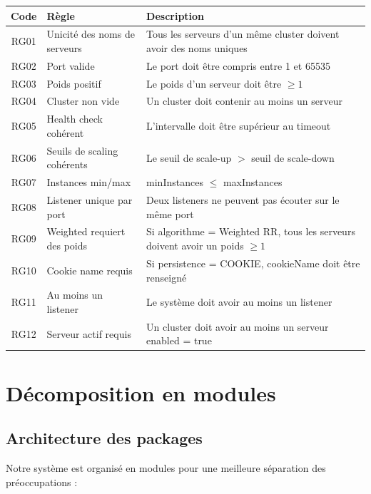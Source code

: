 \documentclass[12pt,a4paper]{report}
\begin{document}
\begin{longtable}{|c|p{4cm}|p{8.5cm}|}
\hline
\textbf{Code} & \textbf{Règle} & \textbf{Description} \\
\hline
\endhead
RG01 & Unicité des noms de serveurs & Tous les serveurs d'un même cluster doivent avoir des noms uniques \\
\hline
RG02 & Port valide & Le port doit être compris entre 1 et 65535 \\
\hline
RG03 & Poids positif & Le poids d'un serveur doit être $\geq 1$ \\
\hline
RG04 & Cluster non vide & Un cluster doit contenir au moins un serveur \\
\hline
RG05 & Health check cohérent & L'intervalle doit être supérieur au timeout \\
\hline
RG06 & Seuils de scaling cohérents & Le seuil de scale-up $>$ seuil de scale-down \\
\hline
RG07 & Instances min/max & minInstances $\leq$ maxInstances \\
\hline
RG08 & Listener unique par port & Deux listeners ne peuvent pas écouter sur le même port \\
\hline
RG09 & Weighted requiert des poids & Si algorithme = Weighted RR, tous les serveurs doivent avoir un poids $\geq 1$ \\
\hline
RG10 & Cookie name requis & Si persistence = COOKIE, cookieName doit être renseigné \\
\hline
RG11 & Au moins un listener & Le système doit avoir au moins un listener \\
\hline
RG12 & Serveur actif requis & Un cluster doit avoir au moins un serveur enabled = true \\
\hline
\end{longtable}

\chapter{Décomposition en modules}

\section{Architecture des packages}

Notre système est organisé en modules pour une meilleure séparation des préoccupations :
\end{document}
